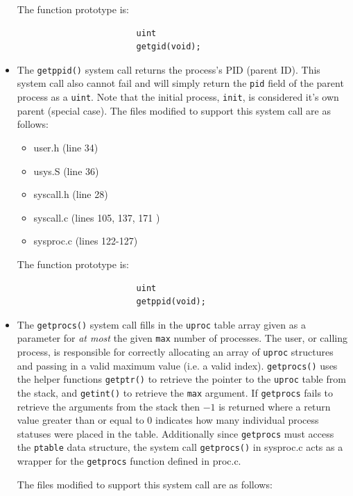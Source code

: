 \documentclass[11pt,letterpaper]{report}
\begin{document}
\begin{itemize}
					The function prototype is:
					\begin{verbatim}
						uint
						getgid(void);
					\end{verbatim}
			
			\item The {\tt getppid()} system call returns the process's PID (parent ID). This system call also cannot fail and will simply return the {\tt pid} field of the parent 				
			process as a {\tt uint}. Note that the initial process, {\tt init}, is considered it's own parent (special case). 
			 	The files modified to support this system call are as follows:
				 
					 \begin{itemize}
					
					\item user.h (line 34)
					\item usys.S (line 36)
					\item syscall.h (line 28)
					\item syscall.c (lines 105, 137, 171 )
					\item sysproc.c (lines 122-127)
					
					\end{itemize}
					
					The function prototype is:
					\begin{verbatim}
						uint
						getppid(void);
					\end{verbatim}
				
			\item The {\tt getprocs()} system call fills in the {\tt uproc} table array given as a parameter for \emph{at most} the given {\tt max} number of
				processes. The user, or calling process, is responsible for correctly allocating an array of {\tt uproc} structures and passing in a valid maximum value (i.e. a 
				valid index). {\tt getprocs()} uses the helper functions {\tt getptr()} to retrieve the pointer to the {\tt uproc} table from the stack, and 
				{\tt getint()} to retrieve the {\tt max} argument. If {\tt getprocs} fails to retrieve the arguments from the stack then $-1$ is returned where a 
				return value greater than or equal to $0$ indicates how many individual process statuses were placed in the table. Additionally since 
				{\tt getprocs} must access the {\tt ptable} data structure, the system call {\tt getprocs()} in sysproc.c acts as a wrapper for the {\tt getprocs} 
				function defined in proc.c. 
		
					The files modified to support this system call are as follows:
				 

\end{itemize}
\end{document}
